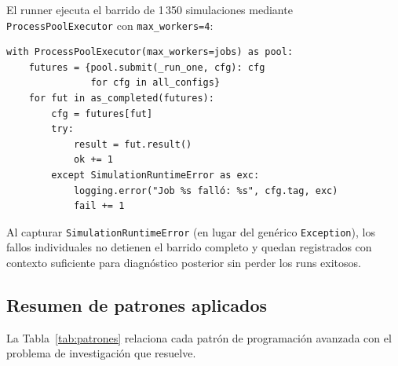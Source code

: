 El runner ejecuta el barrido de 1\,350 simulaciones mediante
\verb|ProcessPoolExecutor| con \verb|max_workers=4|:

\begin{lstlisting}[caption={Barrido paralelo en \texttt{runner.py}.}]
with ProcessPoolExecutor(max_workers=jobs) as pool:
    futures = {pool.submit(_run_one, cfg): cfg
               for cfg in all_configs}
    for fut in as_completed(futures):
        cfg = futures[fut]
        try:
            result = fut.result()
            ok += 1
        except SimulationRuntimeError as exc:
            logging.error("Job %s falló: %s", cfg.tag, exc)
            fail += 1
\end{lstlisting}

Al capturar \verb|SimulationRuntimeError| (en lugar del genérico
\verb|Exception|), los fallos individuales no detienen el barrido completo y
quedan registrados con contexto suficiente para diagnóstico posterior sin
perder los runs exitosos.

\subsection{Resumen de patrones aplicados}

La Tabla~\ref{tab:patrones} relaciona cada patrón de programación avanzada
con el problema de investigación que resuelve.

